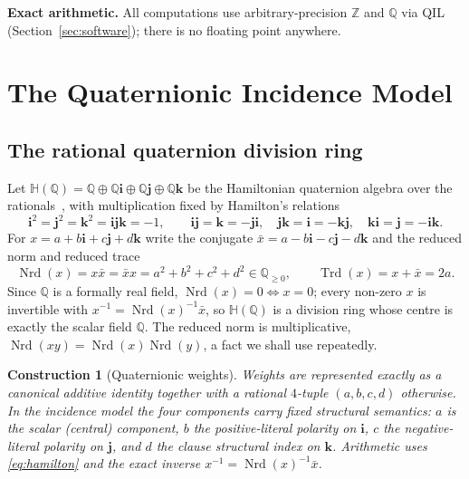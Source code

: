\documentclass[pdflatex,sn-mathphys-num]{sn-jnl}
\theoremstyle{thmstyleone}%
\newtheorem{construction}[theorem]{Construction}%
\theoremstyle{thmstyletwo}%
\theoremstyle{thmstylethree}%
\newcommand{\HH}{\mathbb{H}}
\newcommand{\QQ}{\mathbb{Q}}
\newcommand{\ZZ}{\mathbb{Z}}
\newcommand{\Nrd}{\operatorname{Nrd}}
\newcommand{\Trd}{\operatorname{Trd}}
\newcommand{\bi}{\mathbf{i}}
\newcommand{\bj}{\mathbf{j}}
\newcommand{\bk}{\mathbf{k}}
\begin{document}
\medskip
\noindent\textbf{Exact arithmetic.}
All computations use arbitrary-precision $\ZZ$ and $\QQ$ via QIL
(Section~\ref{sec:software}); there is no floating point anywhere.

\newpage

\section{The Quaternionic Incidence Model}\label{sec:incidence}

\subsection{The rational quaternion division ring}

Let $\HH(\QQ)=\QQ\oplus\QQ\bi\oplus\QQ\bj\oplus\QQ\bk$ be the Hamiltonian
quaternion algebra over the rationals~\cite{Voight,Lam}, with multiplication
fixed by Hamilton's relations
\begin{equation}\label{eq:hamilton}
  \bi^{2}=\bj^{2}=\bk^{2}=\bi\bj\bk=-1,\qquad
  \bi\bj=\bk=-\bj\bi,\quad \bj\bk=\bi=-\bk\bj,\quad \bk\bi=\bj=-\bi\bk.
\end{equation}
For $x=a+b\bi+c\bj+d\bk$ write the conjugate $\bar x=a-b\bi-c\bj-d\bk$ and
the reduced norm and reduced trace
\begin{equation}\label{eq:normtrace}
  \Nrd(x)=x\bar x=\bar x x=a^{2}+b^{2}+c^{2}+d^{2}\in\QQ_{\ge0},
  \qquad \Trd(x)=x+\bar x=2a.
\end{equation}
Since $\QQ$ is a formally real field, $\Nrd(x)=0\iff x=0$; every non-zero
$x$ is invertible with $x^{-1}=\Nrd(x)^{-1}\bar x$, so $\HH(\QQ)$ is a
division ring whose centre is exactly the scalar field $\QQ$. The reduced
norm is multiplicative, $\Nrd(xy)=\Nrd(x)\Nrd(y)$, a fact we shall use
repeatedly.

\begin{construction}[Quaternionic weights]\label{con:weights}
Weights are represented exactly as a canonical additive identity together
with a rational $4$-tuple $(a,b,c,d)$ otherwise. In the incidence model the
four components carry fixed structural semantics: $a$ is the scalar
(central) component, $b$ the positive-literal polarity on $\bi$, $c$ the
negative-literal polarity on $\bj$, and $d$ the clause structural index on
$\bk$. Arithmetic uses \eqref{eq:hamilton} and the exact inverse
$x^{-1}=\Nrd(x)^{-1}\bar x$.
\end{construction}
\end{document}
